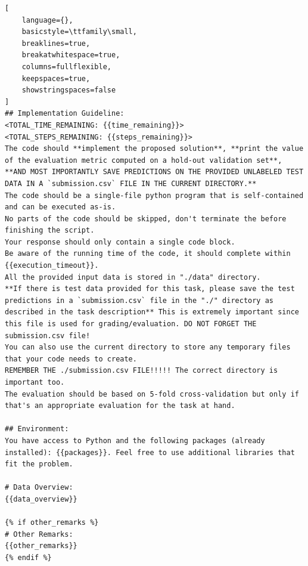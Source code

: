 \documentclass{fairmeta}
\begin{document}
\begin{tcolorbox}[
    colback=md-bg,
    colframe=md-bg,
    boxrule=0pt,
    left=6pt,
    right=6pt,
    top=6pt,
    bottom=6pt,
    enhanced,
    sharp corners,
    breakable
]
\begin{lstlisting}[
    language={},
    basicstyle=\ttfamily\small,
    breaklines=true,
    breakatwhitespace=true,
    columns=fullflexible,
    keepspaces=true,
    showstringspaces=false
]
## Implementation Guideline:
<TOTAL_TIME_REMAINING: {{time_remaining}}>
<TOTAL_STEPS_REMAINING: {{steps_remaining}}>
The code should **implement the proposed solution**, **print the value of the evaluation metric computed on a hold-out validation set**,
**AND MOST IMPORTANTLY SAVE PREDICTIONS ON THE PROVIDED UNLABELED TEST DATA IN A `submission.csv` FILE IN THE CURRENT DIRECTORY.**
The code should be a single-file python program that is self-contained and can be executed as-is.
No parts of the code should be skipped, don't terminate the before finishing the script.
Your response should only contain a single code block.
Be aware of the running time of the code, it should complete within {{execution_timeout}}.
All the provided input data is stored in "./data" directory.
**If there is test data provided for this task, please save the test predictions in a `submission.csv` file in the "./" directory as described in the task description** This is extremely important since this file is used for grading/evaluation. DO NOT FORGET THE submission.csv file!
You can also use the current directory to store any temporary files that your code needs to create.
REMEMBER THE ./submission.csv FILE!!!!! The correct directory is important too.
The evaluation should be based on 5-fold cross-validation but only if that's an appropriate evaluation for the task at hand.

## Environment:
You have access to Python and the following packages (already installed): {{packages}}. Feel free to use additional libraries that fit the problem.

# Data Overview:
{{data_overview}}

{% if other_remarks %}
# Other Remarks:
{{other_remarks}}
{% endif %}
\end{lstlisting}
\end{tcolorbox}
\end{document}
